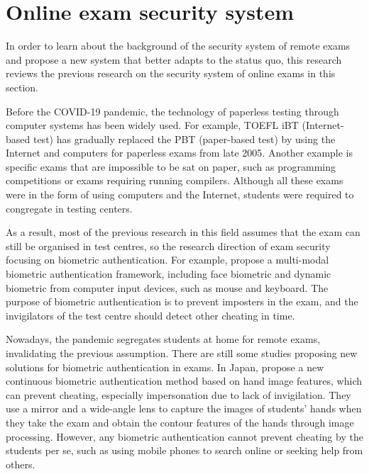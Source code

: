 \section{Online exam security system}
\label{sec:Online exam security system}
In order to learn about the background of the security system of remote exams and propose a new system that better adapts to the status quo, this research reviews the previous research on the security system of online exams in this section.

Before the COVID-19 pandemic, the technology of paperless testing through computer systems has been widely used. For example, TOEFL iBT (Internet-based test) has gradually replaced the PBT (paper-based test) by using the Internet and computers for paperless exams from late 2005.
Another example is specific exams that are impossible to be sat on paper, such as programming competitions or exams requiring running compilers.
Although all these exams were in the form of using computers and the Internet, students were required to congregate in testing centers.

As a result, most of the previous research in this field assumes that the exam can still be organised in test centres, so the research direction of exam security focusing on biometric authentication. For example, \citet{traore2017ensuring} propose a multi-modal biometric authentication framework, including face biometric and dynamic biometric from computer input devices, such as mouse and keyboard. The purpose of biometric authentication is to prevent imposters in the exam, and the invigilators of the test centre should detect other cheating in time.

Nowadays, the pandemic segregates students at home for remote exams, invalidating the previous assumption. There are still some studies proposing new solutions for biometric authentication in exams. 
In Japan, \citet{Akiko202144107} propose a new continuous biometric authentication method based on hand image features, which can prevent cheating, especially impersonation due to lack of invigilation. 
They use a mirror and a wide-angle lens to capture the images of students' hands when they take the exam and obtain the contour features of the hands through image processing.
However, any biometric authentication cannot prevent cheating by the students per se, such as using mobile phones to search online or seeking help from others.

\citet{garg2020convolutional}

